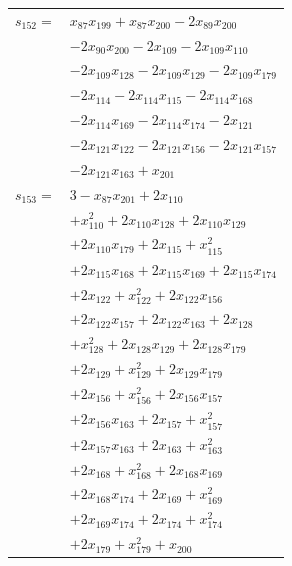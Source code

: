 \begin{longtable}{@{}r@{\;}l@{}}
\(s_{152}=\) & \(\displaystyle x_{87}x_{199} +x_{87}x_{200} -2x_{89}x_{200}\) \\
 & \(\displaystyle -2x_{90}x_{200} -2x_{109} -2x_{109}x_{110}\) \\
 & \(\displaystyle -2x_{109}x_{128} -2x_{109}x_{129} -2x_{109}x_{179}\) \\
 & \(\displaystyle -2x_{114} -2x_{114}x_{115} -2x_{114}x_{168}\) \\
 & \(\displaystyle -2x_{114}x_{169} -2x_{114}x_{174} -2x_{121}\) \\
 & \(\displaystyle -2x_{121}x_{122} -2x_{121}x_{156} -2x_{121}x_{157}\) \\
 & \(\displaystyle -2x_{121}x_{163} +x_{201}\) \\[3pt]
\(s_{153}=\) & \(\displaystyle 3 -x_{87}x_{201} +2x_{110}\) \\
 & \(\displaystyle +x_{110}^{2} +2x_{110}x_{128} +2x_{110}x_{129}\) \\
 & \(\displaystyle +2x_{110}x_{179} +2x_{115} +x_{115}^{2}\) \\
 & \(\displaystyle +2x_{115}x_{168} +2x_{115}x_{169} +2x_{115}x_{174}\) \\
 & \(\displaystyle +2x_{122} +x_{122}^{2} +2x_{122}x_{156}\) \\
 & \(\displaystyle +2x_{122}x_{157} +2x_{122}x_{163} +2x_{128}\) \\
 & \(\displaystyle +x_{128}^{2} +2x_{128}x_{129} +2x_{128}x_{179}\) \\
 & \(\displaystyle +2x_{129} +x_{129}^{2} +2x_{129}x_{179}\) \\
 & \(\displaystyle +2x_{156} +x_{156}^{2} +2x_{156}x_{157}\) \\
 & \(\displaystyle +2x_{156}x_{163} +2x_{157} +x_{157}^{2}\) \\
 & \(\displaystyle +2x_{157}x_{163} +2x_{163} +x_{163}^{2}\) \\
 & \(\displaystyle +2x_{168} +x_{168}^{2} +2x_{168}x_{169}\) \\
 & \(\displaystyle +2x_{168}x_{174} +2x_{169} +x_{169}^{2}\) \\
 & \(\displaystyle +2x_{169}x_{174} +2x_{174} +x_{174}^{2}\) \\
 & \(\displaystyle +2x_{179} +x_{179}^{2} +x_{200}\) \\[3pt]
\end{longtable}
\endgroup
